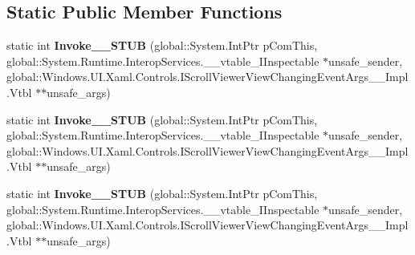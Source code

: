 \subsection*{Static Public Member Functions}
\begin{DoxyCompactItemize}
\item 
\mbox{\label{struct_system_1_1_event_handler___a___windows___u_i___xaml___controls___scroll_viewer_view_chang628699d11d7aafe20e51b1c40740a5dc_aeecaab2ce57525a14c9208bd3763ba77}} 
static int {\bfseries Invoke\+\_\+\+\_\+\+S\+T\+UB} (global\+::\+System.\+Int\+Ptr p\+Com\+This, global\+::\+System.\+Runtime.\+Interop\+Services.\+\_\+\+\_\+vtable\+\_\+\+I\+Inspectable $\ast$unsafe\+\_\+sender, global\+::\+Windows.\+U\+I.\+Xaml.\+Controls.\+I\+Scroll\+Viewer\+View\+Changing\+Event\+Args\+\_\+\+\_\+\+Impl.\+Vtbl $\ast$$\ast$unsafe\+\_\+args)
\item 
\mbox{\label{struct_system_1_1_event_handler___a___windows___u_i___xaml___controls___scroll_viewer_view_chang628699d11d7aafe20e51b1c40740a5dc_aeecaab2ce57525a14c9208bd3763ba77}} 
static int {\bfseries Invoke\+\_\+\+\_\+\+S\+T\+UB} (global\+::\+System.\+Int\+Ptr p\+Com\+This, global\+::\+System.\+Runtime.\+Interop\+Services.\+\_\+\+\_\+vtable\+\_\+\+I\+Inspectable $\ast$unsafe\+\_\+sender, global\+::\+Windows.\+U\+I.\+Xaml.\+Controls.\+I\+Scroll\+Viewer\+View\+Changing\+Event\+Args\+\_\+\+\_\+\+Impl.\+Vtbl $\ast$$\ast$unsafe\+\_\+args)
\item 
\mbox{\label{struct_system_1_1_event_handler___a___windows___u_i___xaml___controls___scroll_viewer_view_chang628699d11d7aafe20e51b1c40740a5dc_aeecaab2ce57525a14c9208bd3763ba77}} 
static int {\bfseries Invoke\+\_\+\+\_\+\+S\+T\+UB} (global\+::\+System.\+Int\+Ptr p\+Com\+This, global\+::\+System.\+Runtime.\+Interop\+Services.\+\_\+\+\_\+vtable\+\_\+\+I\+Inspectable $\ast$unsafe\+\_\+sender, global\+::\+Windows.\+U\+I.\+Xaml.\+Controls.\+I\+Scroll\+Viewer\+View\+Changing\+Event\+Args\+\_\+\+\_\+\+Impl.\+Vtbl $\ast$$\ast$unsafe\+\_\+args)
\item 
$$
\end{DoxyCompactItemize}
